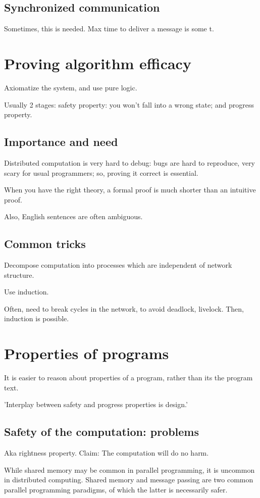 \documentclass[oneside, article]{memoir}
\begin{document}
\subsection{Synchronized communication}
Sometimes, this is needed. Max time to deliver a message is some t.

\section{Proving algorithm efficacy}
Axiomatize the system, and use pure logic.

Usually 2 stages: safety property: you won't fall into a wrong state; and progress property.

\subsection{Importance and need}
Distributed computation is very hard to debug: bugs are hard to reproduce, very scary for usual programmers; so, proving it correct is essential.

When you have the right theory, a formal proof is much shorter than an intuitive proof.

Also, English sentences are often ambiguous.

\subsection{Common tricks}
Decompose computation into processes which are independent of network structure.

Use induction.

Often, need to break cycles in the network, to avoid deadlock, livelock. Then, induction is possible.

\section{Properties of programs}
It is easier to reason about properties of a program, rather than its the program text.

'Interplay between safety and progress properties is design.'

\subsection{Safety of the computation: problems}
Aka rightness property. Claim: The computation will do no harm.

While shared memory may be common in parallel programming, it is uncommon in distributed computing. Shared memory and message passing are two common parallel programming paradigms, of which the latter is necessarily safer.
\end{document}

